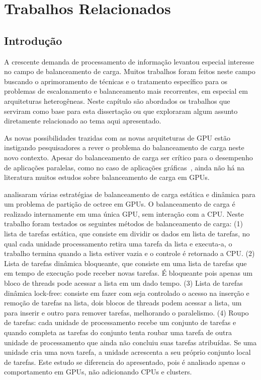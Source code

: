 \pagestyle{empty}
\cleardoublepage
\pagestyle{fancy}

\onehalfspacing

\chapter{Trabalhos Relacionados}\label{cap2}

\section{Introdução}\label{cap2:intro}


A crescente demanda de processamento de informação levantou especial interesse no campo de balanceamento de carga. Muitos trabalhos foram feitos neste campo buscando o aprimoramento de técnicas e o tratamento específico para os problemas de escalonamento e balanceamento mais recorrentes, em especial em arquiteturas heterogêneas. Neste capítulo são abordados os trabalhos que serviram como base para esta dissertação ou que exploraram algum assunto diretamente relacionado ao tema aqui apresentado. 


As novas possibilidades trazidas com as novas arquiteturas de GPU
estão instigando pesquisadores a rever o problema do balanceamento de
carga neste novo contexto. Apesar do balanceamento de carga ser crítico para o desempenho de aplicações paralelas, como no caso de aplicações gráficas~\citep{kdtree, ray}, ainda não há na literatura muitos estudos sobre balanceamento de carga em GPUs.

\citep{graphics} analisaram várias estratégias de balanceamento de carga estática
e dinâmica para um problema de partição de octree em GPUs. O balanceamento de
carga é realizado internamente em uma única GPU, sem interação com a CPU. Neste trabalho foram testados os seguintes métodos de balanceamento de carga: (1) lista de tarefas estática, que consiste em dividir os dados em lista de tarefas, no qual cada unidade processamento retira uma tarefa da lista e executa-a, o trabalho termina quando a lista estiver vazia e o controle é retornado a CPU. (2) Lista de tarefas dinâmica bloqueante, que consiste em uma lista de tarefas que em tempo de execução pode receber novas tarefas. É bloqueante pois apenas um bloco de threads pode acessar a lista em um dado tempo. (3) Lista de tarefas dinâmica lock-free: consiste  
em fazer com seja controlado o acesso na inserção  e remoção de tarefas na lista, dois blocos de threads podem acessar a lista, um para inserir e outro para remover tarefas, melhorando o paralelismo. (4) Roupo de tarefas: cada unidade de processamento recebe um conjunto de tarefas e quando completa as tarefas do conjunto tenta roubar uma tarefa de outra unidade de processamento que ainda não concluiu suas tarefas atribuídas. Se uma unidade cria uma nova tarefa, a unidade acrescenta a seu próprio conjunto local de tarefas. Este estudo se diferencia do apresentado, pois é analisado apenas o comportamento em GPUs, não adicionando CPUs e clusters. 

